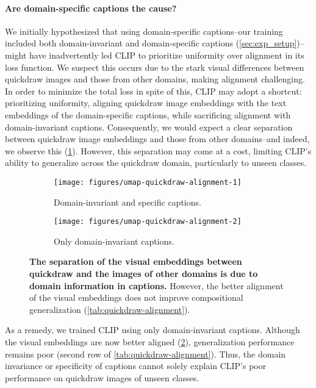 \paragraph{Are domain-specific captions the cause?}
We initially hypothesized that using domain-specific captions--our training included both domain-invariant and domain-specific captions (\cref{sec:exp_setup})--might have inadvertently led CLIP to prioritize uniformity over alignment in its loss function. We suspect this occurs due to the stark visual differences between quickdraw images and those from other domains, making alignment challenging. In order to minimize the total loss in spite of this, CLIP may adopt a shortcut: prioritizing uniformity, aligning quickdraw image embeddings with the text embeddings of the domain-specific captions, while sacrificing alignment with domain-invariant captions. Consequently, we would expect a clear separation between quickdraw image embeddings and those from other domains--and indeed, we observe this (\cref{fig:quickdraw-alignment:non-aligned}). However, this separation may come at a cost, limiting CLIP's ability to generalize across the quickdraw domain, particularly to unseen classes.

\begin{figure}[t]
    \centering
    \begin{subfigure}[c]{0.49\linewidth}
        \centering
        \texttt{[image: figures/umap-quickdraw-alignment-1]}
        \caption{Domain-invariant and specific captions.}
        \label{fig:quickdraw-alignment:non-aligned}
    \end{subfigure}
    \begin{subfigure}[c]{0.49\linewidth}
        \centering
        \texttt{[image: figures/umap-quickdraw-alignment-2]}
        \caption{Only domain-invariant captions.}
        \label{fig:quickdraw-alignment:aligned}
    \end{subfigure}
    \caption{\textbf{The separation of the visual embeddings between quickdraw and the images of other domains is due to domain information in captions.} However, the better alignment of the visual embeddings does not improve compositional generalization (\cref{tab:quickdraw-alignment}).
    }
    \label{fig:quickdraw-alignment}
\end{figure}
As a remedy, we trained CLIP using only domain-invariant captions. Although the visual embeddings are now better aligned (\cref{fig:quickdraw-alignment:aligned}), generalization performance remains poor (second row of \cref{tab:quickdraw-alignment}). Thus, the domain invariance or specificity of captions cannot solely explain CLIP's poor performance on quickdraw images of unseen classes.

